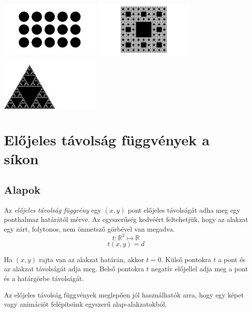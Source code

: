 \begin{center}
  \hfill
\includegraphics[width=5cm]{images/iter01.png}\hfill
\includegraphics[width=5cm]{images/sier4.png}\hfill
\includegraphics[width=5cm]{images/sier3.png}\hfill~
\end{center}


\section{Előjeles távolság függvények a síkon}

\subsection{Alapok}

\begin{tcolorbox}[title=Előjeles távolság függvény (signed distance function)]
  Az \emph{előjeles távolság függvény} egy $(x,y)$ pont előjeles távolságát adha meg egy ponthalmaz határától mérve.
  Az egyszerűség kedvéért feltehetjük, hogy az alakzat egy zárt, folytonos, nem önmetsző görbével van megadva.
  $$ t: \mathbb{R}^2 \mapsto \mathbb{R}$$
  $$ t(x, y) = d$$

  Ha $(x,y)$ rajta van az alakzat határán, akkor $t = 0$. Külső pontokra $t$ a pont és az alakzat távolságát adja meg.
  Belső pontokra $t$ negatív előjellel adja meg a pont és a határgörbe távolságát.
  
  Az előjeles távolság függvények meglepően jól használhatók arra, hogy egy képet vagy animációt felépítsünk egyszerű
  alap-alakzatokból.
  \end{tcolorbox}


